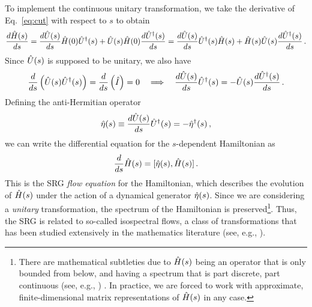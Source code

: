 {To implement the continuous unitary transformation, we take the derivative of
Eq.~\eqref{eq:cut} with respect to $s$ to obtain 
\begin{equation}
   \frac{d {\hat{H}(s)}} {d {s}}  =  \frac{d {\hat{U}(s)}} {d {s}} \hat{H}(0)\hat{U}^\dag(s) + \hat{U}(s)\hat{H}(0) \frac{d {\hat{U}^\dag(s)}} {d {s}} 
                   =  \frac{d {\hat{U}(s)}} {d {s}} \hat{U}^\dag(s)\hat{H}(s) + \hat{H}(s)\hat{U}(s) \frac{d {\hat{U}^\dag(s)}} {d {s}} \,.
\end{equation}
Since $\hat{U}(s)$ is supposed to be unitary, we also have
\begin{equation}
   \frac{d {}} {d {s}} \left(\hat{U}(s)\hat{U}^\dag(s)\right) =  \frac{d {}} {d {s}}  \left(\hat{I}\right) = 0 \quad \Longrightarrow 
  \quad  \frac{d {\hat{U}(s)}} {d {s}} \hat{U}^\dag(s) = - \hat{U}(s) \frac{d {\hat{U}^\dag(s)}} {d {s}} \,.
\end{equation}
Defining the anti-Hermitian operator
\begin{equation}\label{eq:def_eta}
  \etaO(s) \equiv \totd{\UO(s)}{s} \UUO(s) = - \eetaO(s)\,,
\end{equation}
we can write the differential equation for the $s$-dependent Hamiltonian as
\begin{equation} \label{eq:opflow}
  \totd{}{s} \HO(s) = \comm{\etaO(s)}{\HO(s)}\,.
\end{equation}
This is the SRG \emph{flow equation} for the Hamiltonian, which describes the 
evolution of $\hat{H}(s)$ under the action of a dynamical generator $\hat{\eta}(s)$. 
Since we are considering a \emph{unitary} transformation, the spectrum of the 
Hamiltonian is preserved\footnote{There are mathematical subtleties due to 
$\hat{H}(s)$ being an operator that is only bounded from below, and having a 
spectrum that is part discrete, part continuous (see, e.g., \cite{Bach:2010zr,Boutin:2016ef})
. In practice, we are forced
to work with approximate, finite-dimensional matrix representations of $\hat{H}(s)$
in any case.}. Thus, the SRG is related to so-called isospectral flows, a class 
of transformations that has been studied extensively in the mathematics literature 
(see, e.g., \cite{Brockett:1991kx,Chu:1994vn,Chu:1995ys,Bach:2010zr,Boutin:2016ef}).

}
